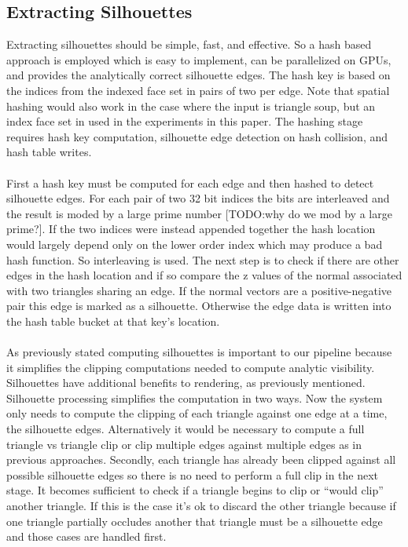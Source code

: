 \documentclass[review]{acmsiggraph}
\begin{document}
\subsection{Extracting Silhouettes}
Extracting silhouettes should be simple, fast, and effective. So a hash based approach is employed which is easy to implement, can be parallelized on GPUs, and provides the analytically correct silhouette edges. The hash key is based on the indices from the indexed face set in pairs of two per edge. Note that spatial hashing would also work in the case where the input is triangle soup, but an index face set in used in the experiments in this paper. The hashing stage requires hash key computation, silhouette edge detection on hash collision, and hash table writes.
\\\\
First a hash key must be computed for each edge and then hashed to detect silhouette edges. For each pair of two 32 bit indices the bits are interleaved and the result is moded by a large prime number [TODO:why do we mod by a large prime?]. If the two indices were instead appended together the hash location would largely depend only on the lower order index which may produce a bad hash function. So interleaving is used. The next step is to check if there are other edges in the hash location and if so compare the z values of the normal associated with two triangles sharing an edge. If the normal vectors are a positive-negative pair this edge is marked as a silhouette. Otherwise the edge data is written into the hash table bucket at that key’s location. 
\\\\
As previously stated computing silhouettes is important to our pipeline because it simplifies the clipping computations needed to compute analytic visibility. Silhouettes have additional benefits to rendering, as previously mentioned. Silhouette processing simplifies the computation in two ways. Now the system only needs to compute the clipping of each triangle against one edge at a time, the silhouette edges. Alternatively it would be necessary to compute a full triangle vs triangle clip or clip multiple edges against multiple edges as in previous approaches. Secondly, each triangle has already been clipped against all possible silhouette edges so there is no need to perform a full clip in the next stage. It becomes sufficient to check if a triangle begins to clip or “would clip” another triangle. If this is the case it’s ok to discard the other triangle because if one triangle partially occludes another that triangle must be a silhouette edge and those cases are handled first.
\\\\
\end{document}
